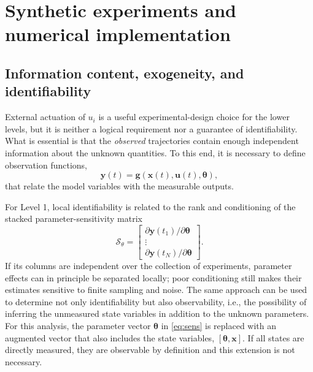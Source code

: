 \documentclass[11pt,a4paper]{article}
\newcommand{\vect}[1]{\boldsymbol{#1}}
\begin{document}
\section{Synthetic experiments and numerical implementation}

\subsection{Information content, exogeneity, and identifiability}

External actuation of \(u_i\) is a useful experimental-design choice for the lower levels, but it is neither a logical requirement nor a guarantee of identifiability. What is essential is that the \textit{observed} trajectories contain enough independent information about the unknown quantities. To this end, it is necessary to define observation functions,
\begin{equation}
    \vect{y}(t) = \vect{g}(\vect{x}(t), \vect{u}(t), \vect{\theta}),
\end{equation}
\noindent that relate the model variables with the measurable outputs. 

For Level 1, local %
identifiability is related to the rank and conditioning of the stacked parameter-sensitivity matrix
\begin{equation}\label{eq:sens}
  \mathcal{S}_{\theta} =
  \begin{bmatrix}
    \partial\vect{y}(t_1)/\partial\vect{\theta}\\
    \vdots\\
    \partial\vect{y}(t_N)/\partial\vect{\theta}
  \end{bmatrix}.
\end{equation}
If its columns are independent over the collection of experiments, parameter effects can in principle be separated locally; poor conditioning still makes their estimates sensitive to finite sampling and noise. 
The same approach can be used to determine not only identifiability but also observability, i.e., the possibility of inferring the unmeasured state variables in addition to the unknown parameters. For this analysis, the parameter vector $\vect{\theta}$ in \eqref{eq:sens} is replaced with an augmented vector that also includes the state variables, $[\vect{\theta},\vect{x}].$ If all states are directly measured, they are observable by definition and this extension is not necessary.
\end{document}
